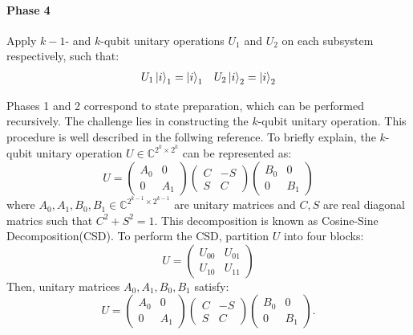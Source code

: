 \documentclass[a4paper, 11pt]{article}
\begin{document}
\paragraph{Phase 4}
Apply $k-1$- and $k$-qubit unitary operations $U_1$ and $U_2$ on each subsystem respectively, such that:
\begin{align}
  U_1 \ket{i}_1 = \ket{i}_1 && U_2 \ket{i}_2 = \ket{i}_2 
\end{align}

Phases 1 and 2 correspond to state preparation, which can be performed recursively. 
The challenge lies in constructing the $k$-qubit unitary operation. This procedure is well described in  the follwing reference\cite{PhysRevA.93.032318}.
To briefly explain, the $k$-qubit unitary operation $U\in \mathbb{C}^{2^k \times 2^k}$ can be represented as:
\begin{equation}
  U = 
  \begin{pmatrix}
    A_{0} & 0 \\
    0 & A_{1}
  \end{pmatrix}
  \begin{pmatrix}
    C & -S \\
    S & C
  \end{pmatrix}
  \begin{pmatrix}
    B_{0} & 0 \\
    0 & B_{1}
  \end{pmatrix}
\end{equation}
where $A_0 , A_1 , B_0 , B_1 \in \mathbb{C}^{2^{k-1} \times 2^{k-1}}$ are unitary matrices and $C, S$ are real diagonal matrics such that $C^2 + S^2 = 1$.
This decomposition is known as Cosine-Sine Decomposition(CSD). 
To perform the CSD, partition $U$ into four blocks:
\begin{equation}
  U = \begin{pmatrix}
    U_{00} & U_{01} \\
    U_{10} & U_{11}
  \end{pmatrix}
\end{equation}
Then, unitary matrices $A_0, A_1, B_0, B_1$ satisfy:
\begin{equation}
  U = 
  \begin{pmatrix}
    A_{0} & 0 \\
    0 & A_{1}
  \end{pmatrix}
  \begin{pmatrix}
    C & -S \\
    S & C
  \end{pmatrix}
  \begin{pmatrix}
    B_{0} & 0 \\
    0 & B_{1}
  \end{pmatrix}.
\end{equation}
\end{document}
